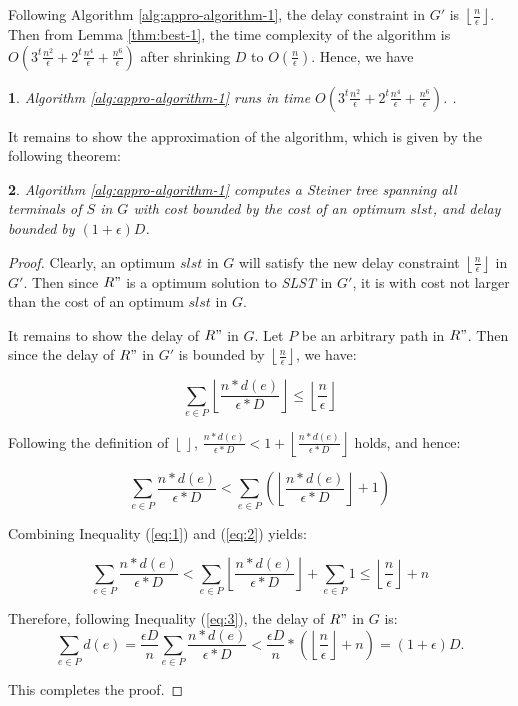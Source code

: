 \documentclass[english,runningheads,a4paper]{llncs}
\newtheorem{thm}{\protect\theoremname}
\newtheorem{lem}[thm]{\protect\lemmaname}
\providecommand{\lemmaname}{Lemma}
\providecommand{\theoremname}{Theorem}
\begin{document}
Following Algorithm \ref{alg:appro-algorithm-1}, the delay constraint
in $G'$ is $\left\lfloor \frac{n}{\epsilon}\right\rfloor $. Then
from Lemma \ref{thm:best-1}, the time complexity of the algorithm
is $O(3^{t}\frac{n^{2}}{\epsilon}+2^{t}\frac{n^{4}}{\epsilon}+\frac{n^{6}}{\epsilon})$
after shrinking $D$ to $O(\frac{n}{\epsilon})$. Hence, we have
\begin{lem}
\label{lm:best}Algorithm \ref{alg:appro-algorithm-1} runs in time
$O(3^{t}\frac{n^{2}}{\epsilon}+2^{t}\frac{n^{4}}{\epsilon}+\frac{n^{6}}{\epsilon})$.
.
\end{lem}
It remains to show the approximation of the algorithm, which is given
by the following theorem:
\begin{thm}
\label{thm:ratio}Algorithm \ref{alg:appro-algorithm-1} computes
a Steiner tree spanning all terminals of $S$ in $G$ with cost bounded
by the cost of an optimum $slst$, and delay bounded by $(1+\epsilon)D$.\end{thm}
\begin{proof}
Clearly, an optimum $slst$ in $G$ will satisfy the new delay constraint
$\left\lfloor \frac{n}{\epsilon}\right\rfloor $ in $G'$. Then since
$R"$ is a optimum solution to \emph{SLST} in $G'$, it is with cost
not larger than the cost of an optimum $slst$ in $G$.

It remains to show the delay of $R"$ in $G$. Let $P$ be an arbitrary
path in $R"$. Then since the delay of $R"$ in $G'$ is bounded by
$\left\lfloor \frac{n}{\epsilon}\right\rfloor $, we have:

\begin{equation}
\sum_{e\in P}\left\lfloor \frac{n*d(e)}{\epsilon*D}\right\rfloor \leq\left\lfloor \frac{n}{\epsilon}\right\rfloor \label{eq:1}
\end{equation}


Following the definition of $\left\lfloor \,\right\rfloor $, $\frac{n*d(e)}{\epsilon*D}<1+\left\lfloor \frac{n*d(e)}{\epsilon*D}\right\rfloor $
holds, and hence:

\begin{equation}
\sum_{e\in P}\frac{n*d(e)}{\epsilon*D}<\sum_{e\in P}(\left\lfloor \frac{n*d(e)}{\epsilon*D}\right\rfloor +1)\label{eq:2}
\end{equation}


Combining Inequality (\ref{eq:1}) and (\ref{eq:2}) yields:

\begin{equation}
\sum_{e\in P}\frac{n*d(e)}{\epsilon*D}<\sum_{e\in P}\left\lfloor \frac{n*d(e)}{\epsilon*D}\right\rfloor +\sum_{e\in P}1\leq\left\lfloor \frac{n}{\epsilon}\right\rfloor +n\label{eq:3}
\end{equation}


Therefore, following Inequality (\ref{eq:3}), the delay of $R"$
in $G$ is:
\[
\sum_{e\in P}d(e)=\frac{\epsilon D}{n}\sum_{e\in P}\frac{n*d(e)}{\epsilon*D}<\frac{\epsilon D}{n}*(\left\lfloor \frac{n}{\epsilon}\right\rfloor +n)=(1+\epsilon)D.
\]


This completes the proof.
\end{proof}
\end{document}
